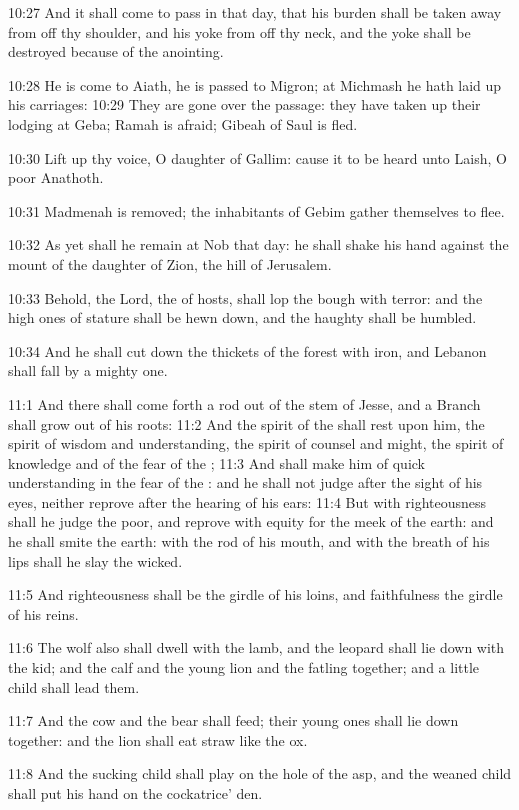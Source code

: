 10:27 And it shall come to pass in that day, that his burden shall be taken away from off thy shoulder, and his yoke from off thy neck, and the yoke shall be destroyed because of the anointing.

10:28 He is come to Aiath, he is passed to Migron; at Michmash he hath laid up his carriages: 10:29 They are gone over the passage: they have taken up their lodging at Geba; Ramah is afraid; Gibeah of Saul is fled.

10:30 Lift up thy voice, O daughter of Gallim: cause it to be heard unto Laish, O poor Anathoth.

10:31 Madmenah is removed; the inhabitants of Gebim gather themselves to flee.

10:32 As yet shall he remain at Nob that day: he shall shake his hand against the mount of the daughter of Zion, the hill of Jerusalem.

10:33 Behold, the Lord, the \LORD of hosts, shall lop the bough with terror: and the high ones of stature shall be hewn down, and the haughty shall be humbled.

10:34 And he shall cut down the thickets of the forest with iron, and Lebanon shall fall by a mighty one.

11:1 And there shall come forth a rod out of the stem of Jesse, and a Branch shall grow out of his roots: 11:2 And the spirit of the \LORD shall rest upon him, the spirit of wisdom and understanding, the spirit of counsel and might, the spirit of knowledge and of the fear of the \LORD; 11:3 And shall make him of quick understanding in the fear of the \LORD: and he shall not judge after the sight of his eyes, neither reprove after the hearing of his ears: 11:4 But with righteousness shall he judge the poor, and reprove with equity for the meek of the earth: and he shall smite the earth: with the rod of his mouth, and with the breath of his lips shall he slay the wicked.

11:5 And righteousness shall be the girdle of his loins, and faithfulness the girdle of his reins.

11:6 The wolf also shall dwell with the lamb, and the leopard shall lie down with the kid; and the calf and the young lion and the fatling together; and a little child shall lead them.

11:7 And the cow and the bear shall feed; their young ones shall lie down together: and the lion shall eat straw like the ox.

11:8 And the sucking child shall play on the hole of the asp, and the weaned child shall put his hand on the cockatrice' den.

